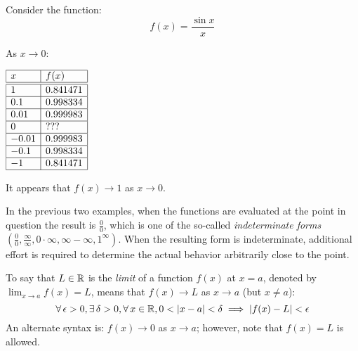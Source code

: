 \documentclass[letterpaper,12pt,fleqn]{article}
\newcommand{\e}{\epsilon}
\renewcommand{\d}{\delta}
\begin{document}
\begin{example}
  Consider the function:
  \[f(x)=\frac{\sin x}{x}\]

  \bigskip

  \begin{center}
  \end{center}

  As \(x\to0\):

  \begin{center}
    \(\begin{array}{|l|l|}
    \hline
    x & f(x) \\
    \hline
    \hline
    1 & 0.841471 \\
    \hline
    0.1 & 0.998334 \\
    \hline
    0.01 & 0.999983 \\
    \hline
    0 & ??? \\
    \hline
    -0.01 & 0.999983 \\
    \hline
    -0.1 & 0.998334 \\
    \hline
    -1 & 0.841471 \\
    \hline
    \end{array}\)
  \end{center}

  \bigskip

  It appears that \(f(x)\to1\) as \(x\to0\).
\end{example}

In the previous two examples, when the functions are evaluated at the point in question the result is
\(\frac{0}{0}\), which is one of the so-called \emph{indeterminate forms} \((\frac{0}{0},\frac{\infty}{\infty},
0\cdot\infty,\infty-\infty,1^{\infty})\).  When the resulting form is indeterminate, additional effort is required
to determine the actual behavior arbitrarily close to the point.

\begin{definition}
  To say that \(L\in\mathbb{R}\) is the \emph{limit} of a function \(f(x)\) at \(x=a\), denoted by
  \(\displaystyle\lim_{x\to a}f(x)=L\), means that \(f(x)\to L\) as \(x\to a\) (but \(x\ne a\)):
  \[\forall\,\e>0,\exists\,\d>0,\forall\,x\in\R,0<\abs{x-a}<\d\implies\abs{f(x)-L}<\e\]
  An alternate syntax is: \(f(x)\to0\) as \(x\to a\); however, note that \(f(x)=L\) is allowed.
\end{definition}
\end{document}
